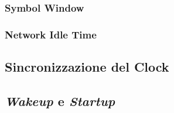 \subsubsection{Symbol Window}

\subsubsection{Network Idle Time}

\subsection{Sincronizzazione del Clock}

\subsection{\emph{Wakeup} e \emph{Startup}}

